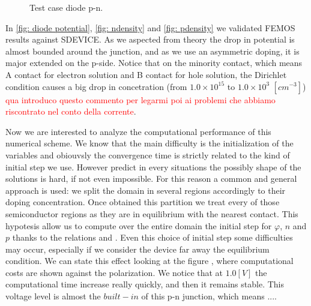 \begin{figure}[!t]
\centering
{}
\hspace{0.5cm}
\hspace{0.5cm}
\caption{Test case diode p-n.}
\label{fig: diodo struttura}
\end{figure}


In \ref{fig: diode potential}, \ref{fig: ndensity} and \ref{fig: pdensity} we validated FEMOS results against SDEVICE. As we aspected from theory the drop in potential is almost bounded around the junction, and as we use an asymmetric doping, it is major extended on the p-side. Notice that on the minority contact, which means A contact for electron solution and B contact for hole solution, the Dirichlet condition causes a big drop in concetration (from $1.0\times 10^{15}$ to $1.0 \times 10^3$ $[cm^{-3}]$) \textcolor{red}{qua introduco questo commento per legarmi poi ai problemi che abbiamo riscontrato nel conto della corrente}. 

Now we are interested to analyze the computational performance of this numerical scheme. We know that the main difficulty is the initialization of the variables and obiouvsly the convergence time is strictly related to the kind of initial step we use. However predict in every situations the possibly shape of the solutions is hard, if not even impossible. For this reason a common and general approach is used: we split the domain in several regions accordingly to their doping concentration. Once obtained this partition we treat every of those semiconductor regions as they are in equilibrium with the nearest contact. This hypotesis allow us to compute over the entire domain the initial step for $\varphi$, $n$ and $p$ thanks to the relations  and . 
Even this choice of initial step some difficulties may occur, especially if we consider the device far away the equilibrium condition. We can state this effect looking at the figure , where computational costs are shown against the polarization. We notice that at $1.0[V]$ the computational time increase really quickly, and then it remains stable.  
This voltage level is almost the $built-in$ of this p-n junction, which means ....

